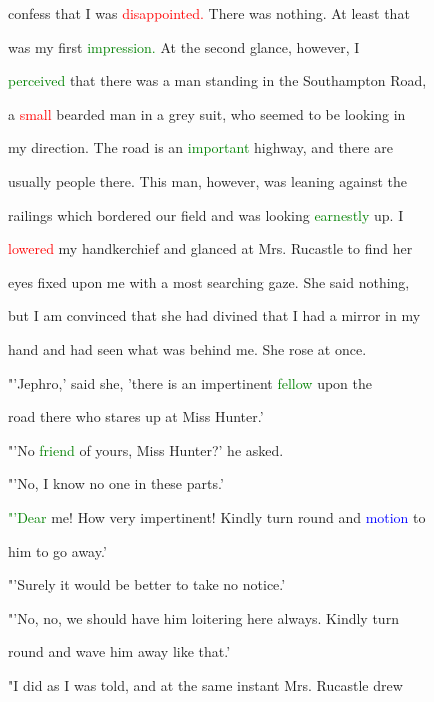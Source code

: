  \textcolor{BurntOrange}{confess} that I was \textcolor{red}{disappointed.} There was nothing. At least that

 was my first \textcolor{green}{impression.} At the second glance, however, I

 \textcolor{green}{perceived} that there was a man standing in the Southampton Road,

 a \textcolor{red}{small} bearded man in a grey suit, who seemed to be looking in

 my direction. The road is an \textcolor{green}{important} highway, and there are

 usually people there. This man, however, was leaning against the

 railings which bordered our field and was looking \textcolor{green}{earnestly} up. I

 \textcolor{red}{lowered} my handkerchief and glanced at Mrs. Rucastle to find her

 eyes fixed upon me with a most searching gaze. She said nothing,

 but I am \textcolor{BurntOrange}{convinced} that she had divined that I had a mirror in my

 hand and had seen what was behind me. She rose at once.



 "'Jephro,' said she, 'there is an impertinent \textcolor{green}{fellow} upon the

 road there who stares up at Miss \textcolor{BurntOrange}{Hunter.'}



 "'No \textcolor{green}{friend} of yours, Miss \textcolor{BurntOrange}{Hunter?'} he asked.



 "'No, I know no one in these parts.'



 \textcolor{green}{"'Dear} me! How very impertinent! Kindly turn round and \textcolor{blue}{motion} to

 him to go away.'



 "'Surely it would be better to take no notice.'



 "'No, no, we should have him loitering here always. Kindly turn

 round and wave him away like that.'



 "I did as I was told, and at the same instant Mrs. Rucastle drew


